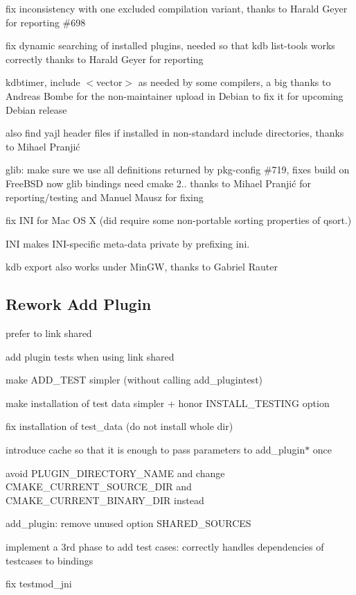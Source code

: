 \begin{DoxyItemize}
\item fix inconsistency with one excluded compilation variant, thanks to Harald Geyer for reporting \#698
\item fix dynamic searching of installed plugins, needed so that kdb list-\/tools works correctly thanks to Harald Geyer for reporting
\item kdbtimer, {\ttfamily include $<$vector$>$} as needed by some compilers, a big thanks to Andreas Bombe for the non-\/maintainer upload in Debian to fix it for upcoming Debian release
\item also find yajl header files if installed in non-\/standard include directories, thanks to Mihael Pranjić
\item glib\+: make sure we use all definitions returned by pkg-\/config \#719, fixes build on Free\+B\+S\+D now glib bindings need cmake 2.. thanks to Mihael Pranjić for reporting/testing and Manuel Mausz for fixing
\item fix I\+N\+I for Mac O\+S X (did require some non-\/portable sorting properties of {\ttfamily qsort}.)
\item I\+N\+I makes I\+N\+I-\/specific meta-\/data private by prefixing {\ttfamily ini}.
\item {\ttfamily kdb export} also works under Min\+G\+W, thanks to Gabriel Rauter
\end{DoxyItemize}

\subsection*{Rework Add Plugin}


\begin{DoxyItemize}
\item prefer to link shared
\item add plugin tests when using link shared
\item make A\+D\+D\+\_\+\+T\+E\+S\+T simpler (without calling add\+\_\+plugintest)
\item make installation of test data simpler + honor I\+N\+S\+T\+A\+L\+L\+\_\+\+T\+E\+S\+T\+I\+N\+G option
\item fix installation of test\+\_\+data (do not install whole dir)
\item introduce cache so that it is enough to pass parameters to add\+\_\+plugin$\ast$ once
\item avoid P\+L\+U\+G\+I\+N\+\_\+\+D\+I\+R\+E\+C\+T\+O\+R\+Y\+\_\+\+N\+A\+M\+E and change C\+M\+A\+K\+E\+\_\+\+C\+U\+R\+R\+E\+N\+T\+\_\+\+S\+O\+U\+R\+C\+E\+\_\+\+D\+I\+R and C\+M\+A\+K\+E\+\_\+\+C\+U\+R\+R\+E\+N\+T\+\_\+\+B\+I\+N\+A\+R\+Y\+\_\+\+D\+I\+R instead
\item add\+\_\+plugin\+: remove unused option S\+H\+A\+R\+E\+D\+\_\+\+S\+O\+U\+R\+C\+E\+S
\item implement a 3rd phase to add test cases\+: correctly handles dependencies of testcases to bindings
\item fix testmod\+\_\+jni
\end{DoxyItemize}

